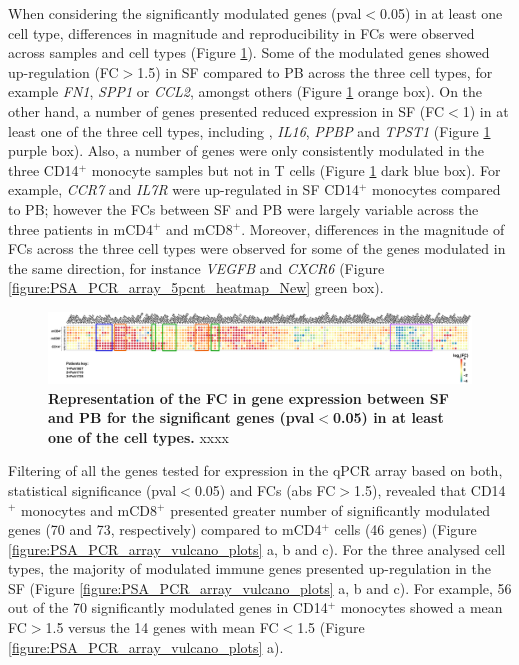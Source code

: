 When considering the significantly modulated genes (pval$<$0.05) in at least one cell type, 
differences in magnitude and reproducibility in FCs were observed across samples and cell types (Figure \ref{figure:PSA_PCR_array_5pcnt_heatmap}). Some of the modulated genes showed up-regulation (FC$>$1.5) in SF compared to PB across the three cell types, for example \textit{FN1}, \textit{SPP1} or \textit{CCL2}, amongst others (Figure \ref{figure:PSA_PCR_array_5pcnt_heatmap} orange box). On the other hand, a number of genes presented reduced expression in SF (FC$<$1) in at least one of the three cell types, including , \textit{IL16}, \textit{PPBP} and \textit{TPST1} (Figure \ref{figure:PSA_PCR_array_5pcnt_heatmap} purple box). Also, a number of genes were only consistently modulated in the three CD14$^+$ monocyte samples but not in T cells (Figure \ref{figure:PSA_PCR_array_5pcnt_heatmap} dark blue box). For example, \textit{CCR7} and \textit{IL7R} were up-regulated in SF CD14$^+$ monocytes compared to PB; however the FCs between SF and PB were largely variable across the three patients in mCD4$^+$ and mCD8$^+$. Moreover, differences in the magnitude of FCs across the three cell types were observed for some of the genes modulated in the same direction, for instance \textit{VEGFB} and \textit{CXCR6} (Figure \ref{figure:PSA_PCR_array_5pcnt_heatmap_New} green box).

\begin{landscape}
\begin{figure}[H]
\centering
\includegraphics[width=1.5\textwidth]{./Results3/pdfs/PCR_array_PSA_SF_vs_PB_filtered_5_percent_genes_heatmap_New}
\caption[Representation of the FC in gene expression between SF and PB for the significant genes (pval$<$0.05) in at least one of the cell types.]{\textbf{Representation of the FC in gene expression between SF and PB for the significant genes (pval$<$0.05) in at least one of the cell types.} xxxx }
\label{figure:PSA_PCR_array_5pcnt_heatmap}
\end{figure}
\end{landscape}


Filtering of all the genes tested for expression in the qPCR array based on both, statistical significance (pval$<$0.05) and FCs (abs FC$>$1.5), revealed that CD14$^+$ monocytes and mCD8$^+$ presented greater number of significantly modulated genes (70 and 73, respectively) compared to mCD4$^+$ cells (46 genes) (Figure \ref{figure:PSA_PCR_array_vulcano_plots} a, b and c). For the three analysed cell types, the majority of modulated immune genes presented up-regulation in the SF (Figure \ref{figure:PSA_PCR_array_vulcano_plots} a, b and c). For example, 56 out of the 70 significantly modulated genes in CD14$^+$ monocytes showed a mean FC$>$1.5 versus the 14 genes with mean FC$<$1.5 (Figure \ref{figure:PSA_PCR_array_vulcano_plots} a).



